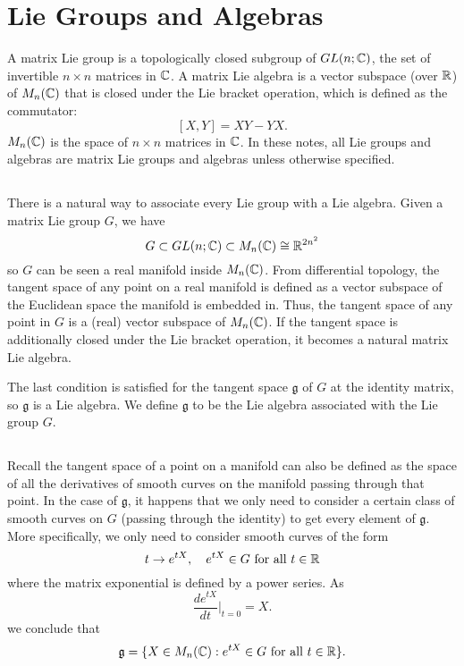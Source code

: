 \section{Lie Groups and Algebras}
A matrix Lie group is a topologically closed subgroup of $GL(n; {\mathbb C})$, the set of invertible $n \times n$ matrices in ${\mathbb C}$. A matrix Lie algebra is a vector subspace (over ${\mathbb R}$) of $M_n({\mathbb C})$ that is closed under the Lie bracket operation, which is defined as the commutator:
\[
    [X, Y] = XY - YX.
\]
$M_n({\mathbb C})$ is the space of $n \times n$ matrices in ${\mathbb C}$. In these notes, all Lie groups and algebras are matrix Lie groups and algebras unless otherwise specified.

\subsection{}
There is a natural way to associate every Lie group with a Lie algebra. Given a matrix Lie group $G$, we have
\[
    G \subset GL(n; {\mathbb C}) \subset M_n({\mathbb C}) \cong {\mathbb R}^{2n^2}
\]
so $G$ can be seen a real manifold inside $M_n({\mathbb C})$. From differential topology, the tangent space of any point on a real manifold is defined as a vector subspace of the Euclidean space the manifold is embedded in. Thus, the tangent space of any point in $G$ is a (real) vector subspace of $M_n({\mathbb C})$. If the tangent space is additionally closed under the Lie bracket operation, it becomes a natural matrix Lie algebra.

The last condition is satisfied for the tangent space $\mathfrak g$ of $G$ at the identity matrix, so $\mathfrak g$ is a Lie algebra. We define $\mathfrak g$ to be the Lie algebra associated with the Lie group $G$.

\subsection{}
Recall the tangent space of a point on a manifold can also be defined as the space of all the derivatives of smooth curves on the manifold passing through that point. In the case of $\mathfrak g$, it happens that we only need to consider a certain class of smooth curves on $G$ (passing through the identity) to get every element of $\mathfrak g$. More specifically, we only need to consider smooth curves of the form
\[
    t \rightarrow e^{tX}, \quad e^{tX} \in G \text{ for all } t \in {\mathbb R}
\]
where the matrix exponential is defined by a power series. As
\[
    \frac{d e^{tX}}{dt} \Bigr|_{t = 0} = X.
\]
we conclude that
\[
    \mathfrak g = \{X \in M_n({\mathbb C}) : e^{tX} \in G \text{ for all } t \in {\mathbb R}\}.
\]

